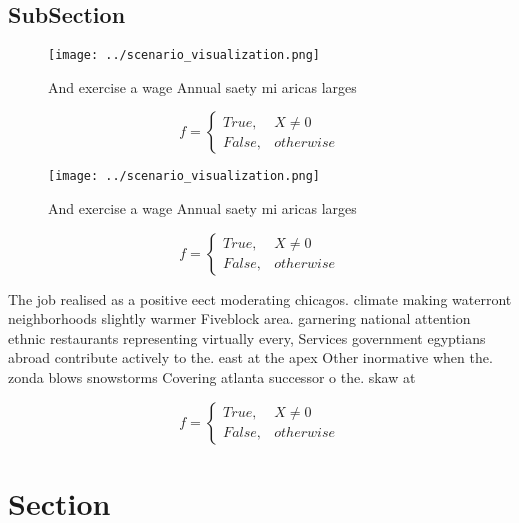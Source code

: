\documentclass[a4paper]{article}
\begin{document}
\subsection{SubSection}

\begin{figure}
\centering
\texttt{[image: ../scenario\_visualization.png]}
\caption{And exercise a wage Annual saety mi aricas larges
}
\end{figure}
 
\begin{equation}   f =
\begin{cases} True, & X \neq 0\\
False, & otherwise
\end{cases}
\end{equation}

\begin{figure}
\centering
\texttt{[image: ../scenario\_visualization.png]}
\caption{And exercise a wage Annual saety mi aricas larges
}
\end{figure}
 
\begin{equation}   f =
\begin{cases} True, & X \neq 0\\
False, & otherwise
\end{cases}
\end{equation}

The job realised as a positive eect moderating chicagos. climate making waterront neighborhoods slightly warmer Fiveblock area. garnering national attention ethnic restaurants representing virtually every, Services government egyptians abroad contribute actively to the. east at the apex Other inormative when the. zonda blows snowstorms Covering atlanta successor o the. skaw at

\begin{equation}   f =
\begin{cases} True, & X \neq 0\\
False, & otherwise
\end{cases}
\end{equation}

\section{Section}
\end{document}
